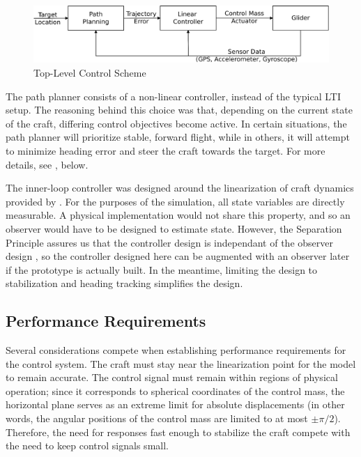 \documentclass{sydeStyle}
\begin{document}
\begin{figure}[h!]
    \centering
    \includegraphics[width=0.8\columnwidth]{figs/flowchart}
    \caption{Top-Level Control Scheme}
    \label{fig:flowchart}
\end{figure}

The path planner consists of a non-linear controller, instead of the typical
LTI setup.  The reasoning behind this choice was that, depending on the current
state of the craft, differing control objectives become active.  In
certain situations, the path planner will prioritize stable, forward flight,
while in others, it will attempt to minimize heading error and steer the craft
towards the target.  For more details, see , below.

The inner-loop controller was designed around the linearization of craft
dynamics provided by \cite{spottiswoode}.  For the purposes of the simulation,
all state variables are directly measurable.  A physical implementation would
not share this property, and so an observer would have to be designed to
estimate state.  However, the Separation Principle assures us that the
controller design is independant of the observer design \cite{brezinski}, so
the controller designed here can be augmented with an observer later if the
prototype is actually built.  In the meantime, limiting the design to
stabilization and heading tracking simplifies the design.

\subsection{Performance Requirements}
\label{sec:perfreq}

Several considerations compete when establishing performance requirements for
the control system.  The craft must stay near the linearization point for the
model to remain accurate.  The control signal must remain within regions of
physical operation; since it corresponds to spherical coordinates of the control
mass, the horizontal plane serves as an extreme limit for absolute displacements
(in other words, the angular positions of the control mass are limited to at
most $\pm \pi/2$).  Therefore, the need for responses fast enough to stabilize
the craft compete with the need to keep control signals small.
\end{document}
